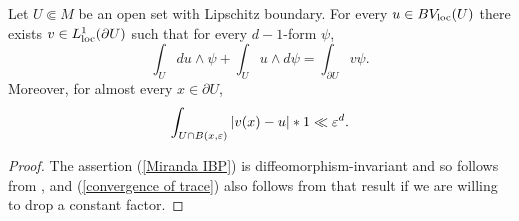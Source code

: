 \begin{proposition}\label{traces}
Let $U \Subset M$ be an open set with Lipschitz boundary.
For every $u \in BV_{\mathrm{loc}}(U)$ there exists $v \in L^1_{\mathrm{loc}}(\partial U)$ such that for every $d-1$-form $\psi$,
\begin{equation}\label{Miranda IBP}
\int_U du \wedge \psi + \int_U u \wedge d\psi = \int_{\partial U} v\psi.
\end{equation}
Moreover, for almost every $x \in \partial U$,
\begin{equation}\label{convergence of trace}
\int_{U \cap B(x, \varepsilon)} |v(x) - u| *1 \ll \varepsilon^d.
\end{equation}
\end{proposition}
\begin{proof}
The assertion (\ref{Miranda IBP}) is diffeomorphism-invariant and so follows from \cite[Teorema 1]{Miranda67}, and (\ref{convergence of trace}) also follows from that result if we are willing to drop a constant factor.
%
%
\end{proof}

